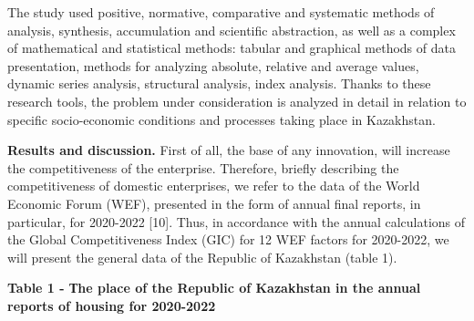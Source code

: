 The study used positive, normative, comparative and systematic methods
of analysis, synthesis, accumulation and scientific abstraction, as well
as a complex of mathematical and statistical methods: tabular and
graphical methods of data presentation, methods for analyzing absolute,
relative and average values, dynamic series analysis, structural
analysis, index analysis. Thanks to these research tools, the problem
under consideration is analyzed in detail in relation to specific
socio-economic conditions and processes taking place in Kazakhstan.

{\bfseries Results and discussion.} First of all, the base of any
innovation, will increase the competitiveness of the enterprise.
Therefore, briefly describing the competitiveness of domestic
enterprises, we refer to the data of the World Economic Forum (WEF),
presented in the form of annual final reports, in particular, for
2020-2022 {[}10{]}. Thus, in accordance with the annual calculations of
the Global Competitiveness Index (GIC) for 12 WEF factors for 2020-2022,
we will present the general data of the Republic of Kazakhstan (table
1).

{\bfseries Table 1 - Тhe place of the Republic of Kazakhstan in the annual
reports of housing for 2020-2022}

